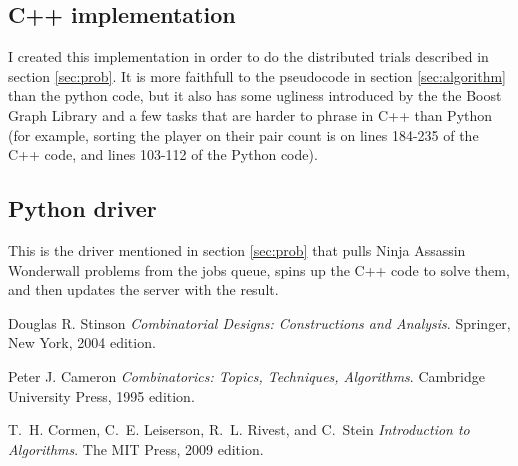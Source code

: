 \documentclass[12pt]{article}
\begin{document}
    \subsection{C++ implementation}
        I created this implementation in order to do the distributed trials described in section \ref{sec:prob}. It is more faithfull to the pseudocode in section \ref{sec:algorithm} than the python code, but it also has some ugliness introduced by the the Boost Graph Library and a few tasks that are harder to phrase in C++ than Python (for example, sorting the player on their pair count is on lines 184-235 of the C++ code, and lines 103-112 of the Python code).
        
    \subsection{Python driver}
        This is the driver mentioned in section \ref{sec:prob} that pulls Ninja Assassin Wonderwall problems from the jobs queue, spins up the C++ code to solve them, and then updates the server with the result.
        

\begin{thebibliography}{9}

    Douglas R. Stinson
    \emph{Combinatorial Designs: Constructions and Analysis}.
    Springer, New York,
    2004 edition.

    Peter J. Cameron
    \emph{Combinatorics: Topics, Techniques, Algorithms}.
    Cambridge University Press,
    1995 edition.

    T.~H. Cormen, C.~E. Leiserson, R.~L. Rivest, and C.~Stein
    \emph{Introduction to Algorithms}.
    The MIT Press,
    2009 edition.


\end{thebibliography}
\end{document}
